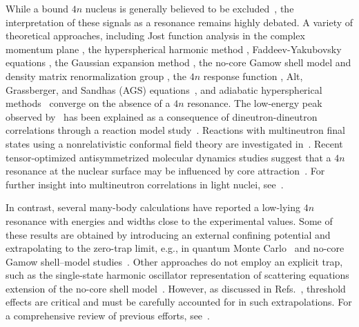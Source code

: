 \documentclass[aps,prl,showpacs,twocolumn,preprintnumbers,superscriptaddress,nofootinbib,floatfix,10pt]{revtex4-1}
\begin{document}
While a bound $4n$ nucleus is generally believed to be excluded~\cite{Lazauskas:2022mvq,Marques:2021mqf,Bertulani:2002px}, the interpretation of these signals as a resonance remains highly debated. A variety of theoretical approaches, including Jost function analysis in the complex momentum plane \cite{Sofianos:1997nn}, the hyperspherical harmonic method \cite{Grigorenko:2004}, Faddeev-Yakubovsky equations \cite{Lazauskas:2005ig,Hiyama:2016nwn,Carbonell:2017dfl}, the Gaussian expansion method \cite{Hiyama:2016nwn,Carbonell:2017dfl}, the no-core Gamow shell model and density matrix renormalization group \cite{Fossez:2016dch}, the $4n$ response function \cite{Lazauskas:2017cfi}, Alt, Grassberger, and Sandhas (AGS) equations~\cite{Deltuva:2018xoa,Deltuva:2019mnv}, and adiabatic hyperspherical methods~\cite{Higgins:2020avy,Higgins:2020pbe} converge on the absence of a $4n$ resonance. The low-energy peak observed by~\cite{Duer:2022ehf} has been explained as a consequence of dineutron-dineutron correlations through a reaction model study~\cite{Lazauskas:2022mvq}. Reactions with multineutron final states using a nonrelativistic conformal field theory are investigated in~\cite{Hammer:2021zxb}.
Recent tensor-optimized antisymmetrized molecular dynamics studies suggest that a $4n$ resonance at the nuclear surface may be influenced by core attraction~\cite{Wan:2025itw}.
For further insight into multineutron correlations in light nuclei, see~\cite{Zhang:2025uin}.

In contrast, several many-body calculations have reported a low-lying $4n$ resonance with energies and widths close to the experimental values. Some of these results are obtained by introducing an external confining potential and extrapolating to the zero-trap limit, e.g., in quantum Monte Carlo~\cite{Pieper:2003dc,Gandolfi:2016bth} and no-core Gamow shell--model studies~\cite{Li:2019pmg}. Other approaches do not employ an explicit trap, such as the single-state harmonic oscillator representation of scattering equations extension of the no-core shell model~\cite{Shirokov:2016ywq}.
However, as discussed in Refs.~\cite{Deltuva:2019ngx,Ishikawa:2020bcs}, threshold effects are critical and must be carefully accounted for in such extrapolations. For a comprehensive review of previous efforts, see~\cite{Marques:2021mqf}.
\end{document}

